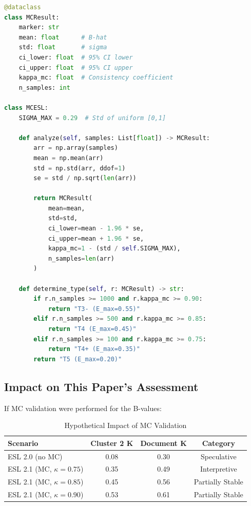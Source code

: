 \documentclass[11pt,a4paper]{article}
\begin{document}
\begin{lstlisting}[language=Python, caption={MC-ESL Core Implementation}]
@dataclass
class MCResult:
    marker: str
    mean: float      # B-hat
    std: float       # sigma
    ci_lower: float  # 95% CI lower
    ci_upper: float  # 95% CI upper
    kappa_mc: float  # Consistency coefficient
    n_samples: int

class MCESL:
    SIGMA_MAX = 0.29  # Std of uniform [0,1]

    def analyze(self, samples: List[float]) -> MCResult:
        arr = np.array(samples)
        mean = np.mean(arr)
        std = np.std(arr, ddof=1)
        se = std / np.sqrt(len(arr))

        return MCResult(
            mean=mean,
            std=std,
            ci_lower=mean - 1.96 * se,
            ci_upper=mean + 1.96 * se,
            kappa_mc=1 - (std / self.SIGMA_MAX),
            n_samples=len(arr)
        )

    def determine_type(self, r: MCResult) -> str:
        if r.n_samples >= 1000 and r.kappa_mc >= 0.90:
            return "T3- (E_max=0.55)"
        elif r.n_samples >= 500 and r.kappa_mc >= 0.85:
            return "T4 (E_max=0.45)"
        elif r.n_samples >= 100 and r.kappa_mc >= 0.75:
            return "T4+ (E_max=0.35)"
        return "T5 (E_max=0.20)"
\end{lstlisting}

\subsection{Impact on This Paper's Assessment}

If MC validation were performed for the B-values:

\begin{table}[h]
\centering
\caption{Hypothetical Impact of MC Validation}
\label{tab:mc-impact}
\begin{tabular}{lccc}
\toprule
\textbf{Scenario} & \textbf{Cluster 2 K} & \textbf{Document K} & \textbf{Category} \\
\midrule
ESL 2.0 (no MC) & 0.08 & 0.30 & Speculative \\
ESL 2.1 (MC, $\kappa=0.75$) & 0.35 & 0.49 & Interpretive \\
ESL 2.1 (MC, $\kappa=0.85$) & 0.45 & 0.56 & Partially Stable \\
ESL 2.1 (MC, $\kappa=0.90$) & 0.53 & 0.61 & Partially Stable \\
\bottomrule
\end{tabular}
\end{table}
\end{document}
